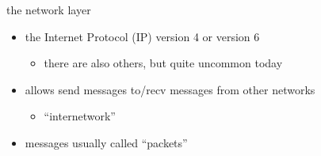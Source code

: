 \usetikzlibrary{calc,positioning,shapes.callouts}

\begin{frame}{the network layer}
\begin{itemize}
\item the Internet Protocol (IP) version 4 or version 6
    \begin{itemize}
    \item there are also others, but quite uncommon today
    \end{itemize}
\item allows send messages to/recv messages from other networks
    \begin{itemize}
    \item ``internetwork''
    \end{itemize}
\item messages usually called ``packets''
\end{itemize}
\end{frame}
